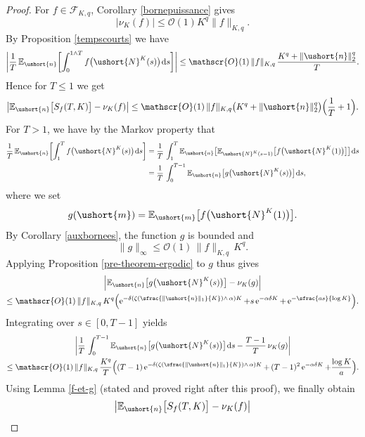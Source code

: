 \documentclass[10pt]{amsart}
\newcommand{\Psfrac}[2]{(\sfrac{#1}{#2})}
\newcommand{\scaleto}[2]{#1}
\let\mathcal\mathscr
\numberwithin{equation}{section}
\theoremstyle{plain}
\theoremstyle{definition}
\newcommand{\E}{{\mathbb{E}}}
\newcommand{\Oun}{\mathcal{O}(1)}
\newcommand{\sK}{K}
\newcommand{\vecn}{\ushort{n}}
\newcommand{\vecm}{\ushort{m}}
\newcommand{\leproc}{\ushort{N}^{K}}
\newcommand{\sleproc}{\ushort{N}^{K}}
\newcommand{\nuk}{\nu_{K}}\let\snuk\nuk
\newcommand{\e}{\operatorname{e}}
\newcommand{\dd}{\hspace{1pt}\mathrm{d}}
\newcommand{\normdeux}[1]{\|#1\|_{2}}\let\snormdeux\normdeux
\begin{document}
\begin{proof}
For $f\in\mathscr{F}\!_{\sK,q}$, Corollary \ref{bornepuissance} gives
\[
\big|\nuk(f)\big| \leq \Oun K^q \|f\|_{\sK,q}.
\]
By Proposition \ref{tempscourts} we have
\[
\biggl|\frac{1}{T}\,\E_{\vecn}
\biggl[\int_{0}^{1\wedge T}f\bigl(\leproc(s)\bigr)\dd s\biggr]\biggr|\le \Oun\, \|f\|_{\sK,q}\, \frac{K^{q}+\normdeux{\vecn}^{\scaleto{q}{3.6pt}}}{T}.
\]
Hence for $T\le 1$ we get
\[
\left|\E_{\vecn}\bigl[S_{f}(T,K)\bigr]-\nuk(f)\right|\le \Oun\, \|f\|_{\sK,q}\bigl(K^{q}
+\normdeux{\vecn}^{\scaleto{q}{3.6pt}}\bigr)
\Bigl(\frac{1}{T}+1\Bigr).
\]
For $T>1$, we have by the Markov property that
\begin{align*}
\frac{1}{T}\,\E_{\vecn}\biggl[\int_{1}^{T}
f\bigl(\leproc(s)\bigr)\dd s\biggr]
&=\frac{1}{T}\,\int_{1}^{T}\E_{\vecn}\bigl[\E_{\sleproc(s-1)}\bigl[f\bigl(\leproc(1)\bigr)\bigr]\bigr]\dd s\\
& =\frac{1}{T}\,\int_{0}^{T-1}\E_{\vecn}\bigl[g\bigl(\leproc(s)\bigr)\bigr]\dd s,
\end{align*}
where we set
\begin{equation}\label{def-g}
g(\vecm)=\E_{\vecm}\bigl[f\bigl(\leproc(1)\bigr)\bigr].
\end{equation}
By Corollary \ref{auxbornees}, the function $g$ is bounded and
\begin{equation}\label{ginfini}
\|g\|_{\infty}\le \Oun\, \|f\|_{\sK,q}\,K^{q}.
\end{equation}
Applying Proposition \ref{pre-theorem-ergodic} to $g$ thus gives
\begin{multline*}
\left|\E_{\vecn}\bigl[g\bigl(\leproc(s)\bigr)\bigr]-\nuk(g)\right|\\
\le \Oun\, \|f\|_{\sK,q}\, K^q \Bigl(\e^{-\delta\left(\zeta\Psfrac{\|\vecn\|_{1}}{K}\wedge\,\alpha\right)K}
+s\e^{-\alpha\delta K}+\e^{-\sfrac{a s}{\log K}}\Bigr).
\end{multline*}
Integrating over $s\in [0,T-1]$ yields
\begin{multline*}
\biggl| \frac{1}{T}\,\int_{0}^{T-1}\E_{\vecn}\bigl[g\bigl(\leproc(s)\bigr)\bigr]\dd s - \frac{T-1}{T}\, \nuk(g)\biggr|\\
\leq \Oun\, \|f\|_{\sK,q} \,\frac{K^q}{T}\Bigl((T-1)\e^{-\delta\left(\zeta\Psfrac{\|\vecn\|_{1}}{K}\wedge\,\alpha\right)K}
+\,(T-1)^2\e^{-\alpha\delta K}+\frac{\log K}{a}\Bigr).
\end{multline*}
Using Lemma \ref{f-et-g} (stated and proved right after this proof), we finally obtain
\begin{align*}
\bigl|\E_{\vecn}\bigl[&S_{f}(T,K)\bigr]-\nuk(f)\bigr|\\

\end{align*}
\end{proof}
\end{document}
